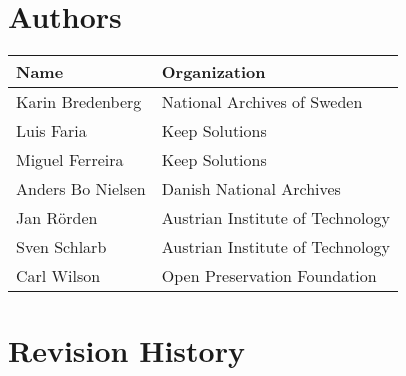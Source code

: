 \pagebreak

\section*{Authors}

\begin{tabular}{|p{6cm}|p{9cm}|}
\hline
\textbf{Name}     & \textbf{Organization}            \\
\hline
Karin Bredenberg  & National Archives of Sweden      \\
\hline
Luis Faria        & Keep Solutions                   \\
\hline
Miguel Ferreira   & Keep Solutions                   \\
\hline
Anders Bo Nielsen & Danish National Archives         \\
\hline
Jan Rörden        & Austrian Institute of Technology \\
\hline
Sven Schlarb      & Austrian Institute of Technology \\
\hline
Carl Wilson       & Open Preservation Foundation    \\
\hline
\end{tabular}


\pagebreak

\section*{Revision History}

